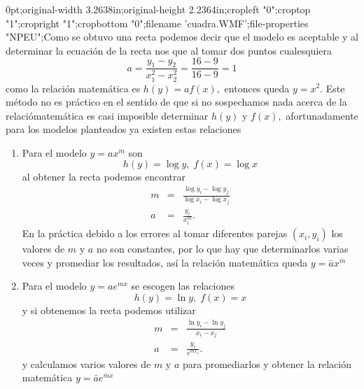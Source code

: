 \documentclass[12pt]{article}
\begin{document}
\begin{enumerate}
{{0pt;original-width 3.2638in;original-height 2.2364in;cropleft "0";croptop
"1";cropright "1";cropbottom "0";filename 'cuadra.WMF';file-properties
"NPEU";}}Como se obtuvo una recta podemos decir que el modelo es aceptable y
al determinar la ecuaci\'{o}n de la recta nos que al tomar dos puntos
cualesquiera 
\begin{equation*}
a=\frac{y_{1}-y_{2}}{x_{1}^{2}-x_{2}^{2}}=\frac{16-9}{16-9}=1
\end{equation*}
como la relaci\'{o}n matem\'{a}tica es $h\left( y\right) =af\left( x\right)
, $ entonces queda $y=x^{2}.$\newline
Este m\'{e}todo no es pr\'{a}ctico en el sentido de que si no sospechamos
nada acerca de la relaci\'{o}matem\'{a}tica es casi imposible determinar $%
h\left( y\right) $ y $f\left( x\right) ,$ afortunadamente para los modelos
planteados ya existen estas relaciones

\begin{enumerate}
\item  Para el modelo $y=ax^{m}$ son 
\begin{equation*}
h\left( y\right) =\log y,\;f\left( x\right) =\log x
\end{equation*}
al obtener la recta podemos
encontrar 
\begin{eqnarray*}
m &=&\frac{\log y_{i}-\log y_{j}}{\log x_{i}-\log x_{j}} \\
a &=&\frac{y_{i}}{x_{i}^{m}}.
\end{eqnarray*}
En la pr\'{a}ctica debido a los errores al tomar diferentes parejas $\left(
x_{i},y_{i}\right) $ los valores de $m$ y $a$ no son constantes, por lo que
hay que determinarlos varias veces y promediar los resultados, as\'{i} la
relaci\'{o}n matem\'{a}tica queda $y=\bar{a}x^{\bar{m}}$

\item  Para el modelo $y=ae^{mx}$ se escogen las relaciones 
\begin{equation*}
h\left( y\right) =\ln y,\;f\left( x\right) =x
\end{equation*}
y si obtenemos la recta podemos utilizar 
\begin{eqnarray*}
m &=&\frac{\ln y_{i}-\ln y_{j}}{x_{i}-x_{j}} \\
a &=&\frac{y_{i}}{e^{mx_{i}}}.
\end{eqnarray*}
y calculamos varios valores de $m$ y $a$ para promediarlos y obtener la
relaci\'{o}n matem\'{a}tica $y=\bar{a}e^{\bar{m}x}$


\end{enumerate}
\end{enumerate}
\end{document}
